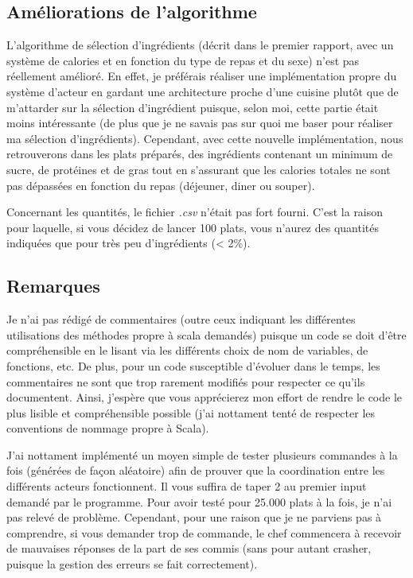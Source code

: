 \subsection{Améliorations de l'algorithme}
L'algorithme de sélection d'ingrédients (décrit dans le premier rapport, 
avec un système de calories et en fonction du type de repas et du sexe) n'est pas réellement 
amélioré. En effet, je préférais réaliser une implémentation propre du système d'acteur 
en gardant une architecture proche d'une cuisine plutôt que de m'attarder sur la sélection
d'ingrédient puisque, selon moi, cette partie était moins 
intéressante (de plus que je ne savais pas sur quoi me baser pour réaliser ma sélection d'ingrédients).
Cependant, avec cette nouvelle implémentation, nous retrouverons dans les plats préparés, des ingrédients 
contenant un minimum de sucre, de protéines et de gras tout en s'assurant que les calories totales ne sont 
pas dépassées en fonction du repas (déjeuner, diner ou souper).

Concernant les quantités, le fichier \textit{.csv} n'était pas fort fourni. C'est la raison pour laquelle,
si vous décidez de lancer 100 plats, vous n'aurez des quantités indiquées que pour très peu d'ingrédients (< 2\%).

\subsection{Remarques}
Je n'ai pas rédigé de commentaires (outre ceux indiquant les différentes
utilisations des méthodes propre à scala demandés) puisque un code se doit d'être compréhensible en le lisant
via les différents choix de nom de variables, de fonctions, etc.
De plus, pour un code susceptible d'évoluer dans le temps, les commentaires ne sont que trop rarement 
modifiés pour respecter ce qu'ils documentent.
Ainsi, j'espère que vous apprécierez mon effort de rendre le code le plus lisible et compréhensible possible
(j'ai nottament tenté de respecter les conventions de nommage propre à Scala).

J'ai nottament implémenté un moyen simple de tester plusieurs commandes à la fois 
(générées de façon aléatoire) afin de prouver que la coordination entre les différents acteurs 
fonctionnent. Il vous suffira de taper 2 au premier input demandé par le programme.
Pour avoir testé pour 25.000 plats à la fois, je n'ai pas relevé de problème. 
Cependant, pour une raison que je ne parviens pas à comprendre, si vous demander trop de commande, 
le chef commencera à recevoir de mauvaises réponses de la part de ses commis (sans pour autant crasher,
puisque la gestion des erreurs se fait correctement).

